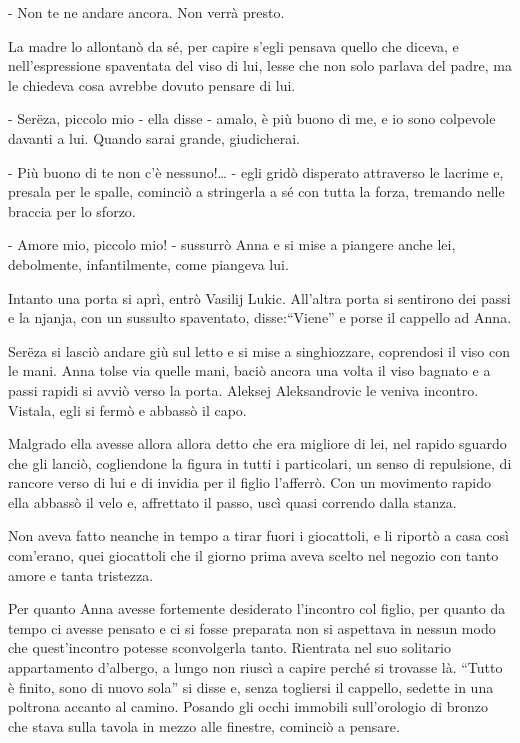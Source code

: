 - Non te ne andare ancora. Non verrà presto. 

La madre lo allontanò da sé, per capire s'egli pensava quello che diceva, e nell'espressione spaventata del viso di lui, lesse che non solo parlava del padre, ma le chiedeva cosa avrebbe dovuto pensare di lui. 

- Serëza, piccolo mio - ella disse - amalo, è più buono di me, e io sono colpevole davanti a lui. Quando sarai grande, giudicherai. 

- Più buono di te non c'è nessuno!\ldots{} - egli gridò disperato attraverso le lacrime e, presala per le spalle, cominciò a stringerla a sé con tutta la forza, tremando nelle braccia per lo sforzo. 

- Amore mio, piccolo mio! - sussurrò Anna e si mise a piangere anche lei, debolmente, infantilmente, come piangeva lui. 

Intanto una porta si aprì, entrò Vasilij Lukic. All'altra porta si sentirono dei passi e la njanja, con un sussulto spaventato, disse:``Viene'' e porse il cappello ad Anna. 

Serëza si lasciò andare giù sul letto e si mise a singhiozzare, coprendosi il viso con le mani. Anna tolse via quelle mani, baciò ancora una volta il viso bagnato e a passi rapidi si avviò verso la porta. Aleksej Aleksandrovic le veniva incontro. Vistala, egli si fermò e abbassò il capo. 

Malgrado ella avesse allora allora detto che era migliore di lei, nel rapido sguardo che gli lanciò, cogliendone la figura in tutti i particolari, un senso di repulsione, di rancore verso di lui e di invidia per il figlio l'afferrò. Con un movimento rapido ella abbassò il velo e, affrettato il passo, uscì quasi correndo dalla stanza. 

Non aveva fatto neanche in tempo a tirar fuori i giocattoli, e li riportò a casa così com'erano, quei giocattoli che il giorno prima aveva scelto nel negozio con tanto amore e tanta tristezza. 

Per quanto Anna avesse fortemente desiderato l'incontro col figlio, per quanto da tempo ci avesse pensato e ci si fosse preparata non si aspettava in nessun modo che quest'incontro potesse sconvolgerla tanto. Rientrata nel suo solitario appartamento d'albergo, a lungo non riuscì a capire perché si trovasse là. ``Tutto è finito, sono di nuovo sola'' si disse e, senza togliersi il cappello, sedette in una poltrona accanto al camino. Posando gli occhi immobili sull'orologio di bronzo che stava sulla tavola in mezzo alle finestre, cominciò a pensare. 

